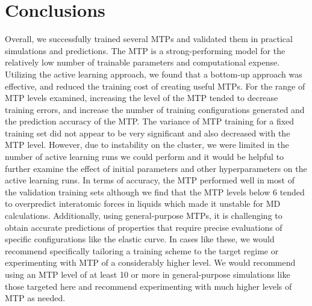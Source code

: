 \documentclass[9pt,twocolumn,twoside]{opticajnl}
\begin{document}
\section{Conclusions}
Overall, we successfully trained several MTPs and validated them in practical simulations and predictions. The MTP is a strong-performing model for the relatively low number of trainable parameters and computational expense. Utilizing the active learning approach, we found that a bottom-up approach was effective, and reduced the training cost of creating useful MTPs. For the range of MTP levels examined, increasing the level of the MTP tended to decrease training errors, and increase the number of training configurations generated and the prediction accuracy of the MTP. The variance of MTP training for a fixed training set did not appear to be very significant and also decreased with the MTP level. However, due to instability on the cluster, we were limited in the number of active learning runs we could perform and it would be helpful to further examine the effect of initial parameters and other hyperparameters on the active learning runs. In terms of accuracy, the MTP performed well in most of the validation training sets although we find that the MTP levels below 6 tended to overpredict interatomic forces in liquids which made it unstable for MD calculations. Additionally, using general-purpose MTPs, it is challenging to obtain accurate predictions of properties that require precise evaluations of specific configurations like the elastic curve. In cases like these, we would recommend specifically tailoring a training scheme to the target regime or experimenting with MTP of a considerably higher level. We would recommend using an MTP level of at least 10 or more in general-purpose simulations like those targeted here and recommend experimenting with much higher levels of MTP as needed. 





\end{document}
